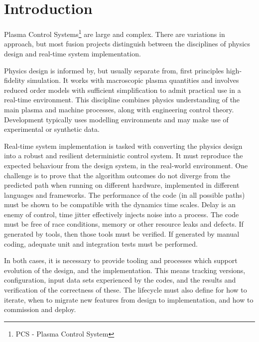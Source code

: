\documentclass[preprint,12pt]{elsarticle}
\begin{document}

\section{Introduction}
\label{sec:intro}


Plasma Control Systems\footnote{PCS - Plasma Control System} are large and complex.
There are variations in approach, but most fusion projects distinguish between
the disciplines of physics design and real-time system implementation.

Physics design is informed by, but usually separate from, first principles 
high-fidelity simulation. It works with macroscopic plasma quantities
and involves reduced order models with sufficient simplification to admit
practical use in a real-time environment.  This discipline combines
physics understanding of the main plasma and machine processes, along
with engineering control theory. Development typically uses modelling 
environments and may make use of experimental or synthetic data.

Real-time system implementation is tasked with converting the physics design
into a robust and resilient deterministic control system.  It must reproduce
the expected behaviour from the design system, in the real-world environment.
One challenge is to prove that the algorithm outcomes do not diverge from
the predicted path when running on different hardware, implemented in different
languages and frameworks. The performance of the code (in all possible paths) 
must be shown to be compatible with the dynamics time scales.  Delay is an enemy of 
control, time jitter effectively injects noise into a process.
The code must be free of race conditions, memory or other resource leaks
and defects.  If generated by tools, then those tools must be verified.
If generated by manual coding, adequate unit and integration tests must
be performed. 

In both cases, it is necessary to provide tooling and processes which support
evolution of the design, and the implementation.  This means tracking versions,
configuration, input data sets experienced by the codes, and the results and
verification of the correctness of these.  The lifecycle must also define
for how to iterate, when to migrate new features from design to implementation,
and how to commission and deploy.
\end{document}
